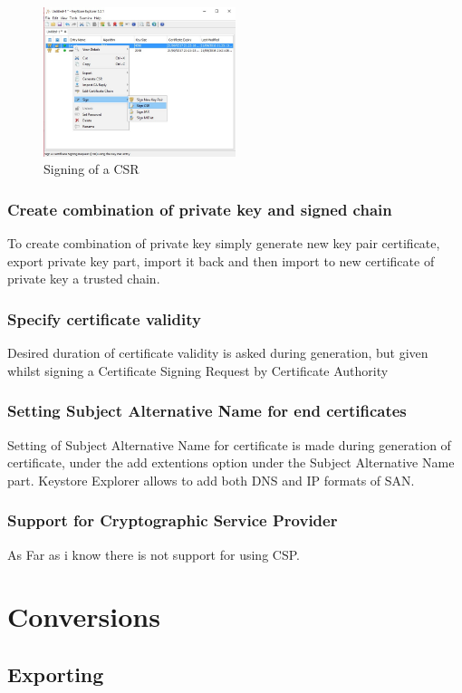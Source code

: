 \documentclass[10pt, a4paper]{report}
\begin{document}
\begin{figure}[!ht]
 \caption{Signing of a CSR}
 \centering
  \includegraphics[width=0.5\textwidth]{../Dependancies/Keystore_Explorer/CSRsign.jpg}
\end{figure}

    \subsubsection{Create combination of private key and signed chain}
To create combination of private key simply generate new key pair certificate, export private key part, import it back and then import to new certificate of private key a trusted chain.

    \subsubsection{Specify certificate validity}
Desired duration of certificate validity is asked during generation, but given whilst signing a Certificate Signing Request by Certificate Authority
    \subsubsection{Setting Subject Alternative Name for end certificates}
Setting of Subject Alternative Name for certificate is made during generation of certificate, under the add extentions option under the Subject Alternative Name part. Keystore Explorer allows to add both DNS and IP formats of SAN.
    \subsubsection{Support for Cryptographic Service Provider}
As Far as i know there is not support for using CSP.
\section{Conversions}

  \subsection{Exporting}
  
\end{document}
